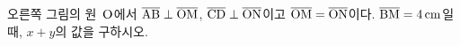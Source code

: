 \noindent\begin{minipage}[t]{0.58\linewidth}\vspace{0pt}\raggedright 오른쪽 그림의 원~$\mathrm{O}$에서 $\overline{\mathrm{AB}}\perp\overline{\mathrm{OM}}$, $\overline{\mathrm{CD}}\perp\overline{\mathrm{ON}}$이고 $\overline{\mathrm{OM}}=\overline{\mathrm{ON}}$이다. $\overline{\mathrm{BM}}=4\,\mathrm{cm}$일 때, $x+y$의 값을 구하시오.\end{minipage}\hfill\begin{minipage}[t]{0.4\linewidth}\vspace{0pt}\centering \resizebox{\ifdim\width>\linewidth\linewidth\else\width\fi}{!}{}\end{minipage}\par
